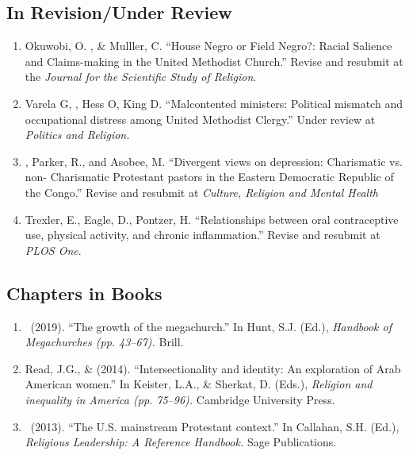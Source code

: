 \subsection*{In Revision/Under Review}
\begin{enumerate}
\item Okuwobi, O. \Eagle, \& Mulller, C. ``House Negro or Field Negro?: Racial Salience and Claims-making in the United Methodist Church.'' Revise and resubmit at the \textit{Journal for the Scientific Study of Religion}.

\item Varela G, \Eagle, Hess O, King D. ``Malcontented ministers: Political mismatch and occupational distress among United Methodist Clergy.'' Under review at \textit{Politics and Religion.}

\item \Eagle, Parker, R., and Asobee, M. ``Divergent views on depression: Charismatic vs. non- Charismatic Protestant pastors in the Eastern Democratic Republic of the Congo.'' Revise and resubmit at \textit{Culture, Religion and Mental Health}

\item Trexler, E., Eagle, D., Pontzer, H. ``Relationships between oral contraceptive use, physical activity, and chronic inflammation.'' Revise and resubmit at \textit{PLOS One}.


\end{enumerate}

\subsection*{Chapters in Books}
\begin{enumerate} 
\item \Eagle\ (2019). ``The growth of the megachurch.'' In Hunt, S.J. (Ed.), \emph{Handbook of Megachurches (pp. 43--67).} Brill.

\item Read, J.G., \& \Eagle \hspace{.01em}  (2014). ``Intersectionality and identity: An exploration of Arab American women.'' In Keister, L.A., \& Sherkat, D. (Eds.), \emph{Religion and inequality in America (pp. 75--96).} Cambridge University Press.

\item \Eagle\ (2013). ``The U.S. mainstream Protestant context.'' In Callahan, S.H. (Ed.), \emph{Religious Leadership: A Reference Handbook.} Sage Publications.
\end{enumerate}

